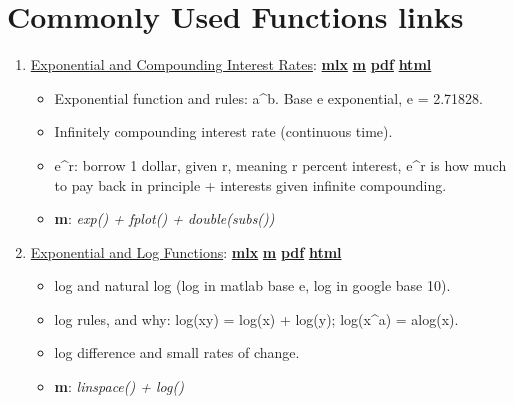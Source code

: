 \documentclass[
]{book}
\providecommand{\tightlist}{%
  \setlength{\itemsep}{0pt}\setlength{\parskip}{0pt}}
\begin{document}
\hypertarget{commonly-used-functions-links}{%
\section{Commonly Used Functions links}\label{commonly-used-functions-links}}

\begin{enumerate}
\def\labelenumi{\arabic{enumi}.}
\tightlist
\item
  \href{https://fanwangecon.github.io/Math4Econ/explog/htmlpdfm/exponential.html}{Exponential and Compounding Interest Rates}: \href{https://github.com/FanWangEcon/Math4Econ/blob/master/explog/exponential.mlx}{\textbf{mlx}} \textbar{} \href{https://github.com/FanWangEcon/Math4Econ/blob/master/explog/htmlpdfm/exponential.m}{\textbf{m}} \textbar{} \href{https://github.com/FanWangEcon/Math4Econ/blob/master/explog/htmlpdfm/exponential.pdf}{\textbf{pdf}} \textbar{} \href{https://fanwangecon.github.io/Math4Econ/explog/htmlpdfm/exponential.html}{\textbf{html}}

  \begin{itemize}
  \tightlist
  \item
    Exponential function and rules: a\^{}b. Base e exponential, e = 2.71828.
  \item
    Infinitely compounding interest rate (continuous time).
  \item
    e\^{}r: borrow 1 dollar, given r, meaning r percent interest, e\^{}r is how much to pay back in principle + interests given infinite compounding.
  \item
    \textbf{m}: \emph{exp() + fplot() + double(subs())}
  \end{itemize}
\item
  \href{https://fanwangecon.github.io/Math4Econ/explog/htmlpdfm/exolog.html}{Exponential and Log Functions}: \href{https://github.com/FanWangEcon/Math4Econ/blob/master/explog/exolog.mlx}{\textbf{mlx}} \textbar{} \href{https://github.com/FanWangEcon/Math4Econ/blob/master/explog/htmlpdfm/exolog.m}{\textbf{m}} \textbar{} \href{https://github.com/FanWangEcon/Math4Econ/blob/master/explog/htmlpdfm/exolog.pdf}{\textbf{pdf}} \textbar{} \href{https://fanwangecon.github.io/Math4Econ/explog/htmlpdfm/exolog.html}{\textbf{html}}

  \begin{itemize}
  \tightlist
  \item
    log and natural log (log in matlab base e, log in google base 10).
  \item
    log rules, and why: log(xy) = log(x) + log(y); log(x\^{}a) = alog(x).
  \item
    log difference and small rates of change.
  \item
    \textbf{m}: \emph{linspace() + log()}
  \end{itemize}
\end{enumerate}
\end{document}
